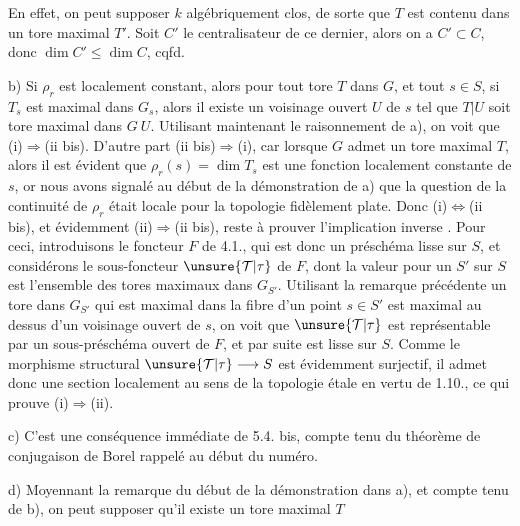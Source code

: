 En effet, on peut supposer $k$ algébriquement clos, de sorte que $T$ est contenu dans un tore maximal $T'$. Soit $C'$ le centralisateur de ce dernier, alors on a $C'\subset C$, donc $\dim C'\leq\dim C$, cqfd.

b)  Si $\rho_r$ est localement constant, alors pour tout tore $T$ dans $G$,  et tout $s\in S$, si $T_s$ est  maximal dans $G_s$, alors il existe un voisinage ouvert $U$ de $s$ tel que $T|U$ soit tore maximal dans $G\ U$. Utilisant maintenant le raisonnement de a), on voit que  (i)$\Longrightarrow$(ii bis). D'autre part (ii bis)$\Longrightarrow$(i), car  lorsque $G$ admet un tore maximal $T$, alors il est évident que $\rho_r(s)=\dim T_s$ est une fonction localement constante de  $s$, or nous avons signalé au début de la démonstration de a) que la question de la continuité de $\rho_r$ était locale pour la topologie fidèlement plate. Donc (i)$\Longleftrightarrow$(ii bis), et évidemment (ii)$\Longrightarrow$(ii bis), reste à prouver l'implication inverse . Pour ceci, introduisons le foncteur $F$ de  4.1., qui est donc un préschéma  lisse  sur $S$, et considérons le sous-foncteur $\unsure{\mathcal T|\tau}$ de $F$, dont la valeur  pour un $S'$ sur $S$ est l'ensemble des tores maximaux dans $G_{S'}$. Utilisant la remarque précédente  un tore dans $G_{S'}$ qui est maximal dans la fibre d'un point $s\in S'$ est maximal au dessus d'un voisinage ouvert de $s$, on voit que $\unsure{\mathcal T|\tau}$ est représentable par un sous-préschéma ouvert de $F$, et par suite est lisse  sur $S$. Comme le morphisme structural $\unsure{\mathcal T|\tau}\longrightarrow S$ est évidemment surjectif, il admet donc  une section localement au sens de la topologie étale en vertu de  1.10., ce qui prouve (i)$\Rightarrow$(ii).

c) C'est une conséquence immédiate de  5.4. bis, compte tenu du théorème de conjugaison de Borel rappelé au début du numéro.

d) Moyennant la remarque du début de la démonstration dans a), et compte tenu de b), on peut supposer qu'il existe un tore maximal $T$

